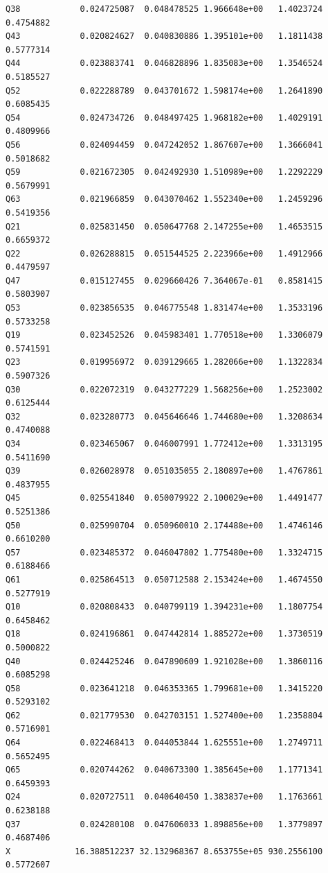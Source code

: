 \documentclass[
]{report}
\begin{document}
\begin{verbatim}
Q38            0.024725087  0.048478525 1.966648e+00   1.4023724 0.4754882
Q43            0.020824627  0.040830886 1.395101e+00   1.1811438 0.5777314
Q44            0.023883741  0.046828896 1.835083e+00   1.3546524 0.5185527
Q52            0.022288789  0.043701672 1.598174e+00   1.2641890 0.6085435
Q54            0.024734726  0.048497425 1.968182e+00   1.4029191 0.4809966
Q56            0.024094459  0.047242052 1.867607e+00   1.3666041 0.5018682
Q59            0.021672305  0.042492930 1.510989e+00   1.2292229 0.5679991
Q63            0.021966859  0.043070462 1.552340e+00   1.2459296 0.5419356
Q21            0.025831450  0.050647768 2.147255e+00   1.4653515 0.6659372
Q22            0.026288815  0.051544525 2.223966e+00   1.4912966 0.4479597
Q47            0.015127455  0.029660426 7.364067e-01   0.8581415 0.5803907
Q53            0.023856535  0.046775548 1.831474e+00   1.3533196 0.5733258
Q19            0.023452526  0.045983401 1.770518e+00   1.3306079 0.5741591
Q23            0.019956972  0.039129665 1.282066e+00   1.1322834 0.5907326
Q30            0.022072319  0.043277229 1.568256e+00   1.2523002 0.6125444
Q32            0.023280773  0.045646646 1.744680e+00   1.3208634 0.4740088
Q34            0.023465067  0.046007991 1.772412e+00   1.3313195 0.5411690
Q39            0.026028978  0.051035055 2.180897e+00   1.4767861 0.4837955
Q45            0.025541840  0.050079922 2.100029e+00   1.4491477 0.5251386
Q50            0.025990704  0.050960010 2.174488e+00   1.4746146 0.6610200
Q57            0.023485372  0.046047802 1.775480e+00   1.3324715 0.6188466
Q61            0.025864513  0.050712588 2.153424e+00   1.4674550 0.5277919
Q10            0.020808433  0.040799119 1.394231e+00   1.1807754 0.6458462
Q18            0.024196861  0.047442814 1.885272e+00   1.3730519 0.5000822
Q40            0.024425246  0.047890609 1.921028e+00   1.3860116 0.6085298
Q58            0.023641218  0.046353365 1.799681e+00   1.3415220 0.5293102
Q62            0.021779530  0.042703151 1.527400e+00   1.2358804 0.5716901
Q64            0.022468413  0.044053844 1.625551e+00   1.2749711 0.5652495
Q65            0.020744262  0.040673300 1.385645e+00   1.1771341 0.6459393
Q24            0.020727511  0.040640450 1.383837e+00   1.1763661 0.6238188
Q37            0.024280108  0.047606033 1.898856e+00   1.3779897 0.4687406
X             16.388512237 32.132968367 8.653755e+05 930.2556100 0.5772607
\end{verbatim}
\end{document}
